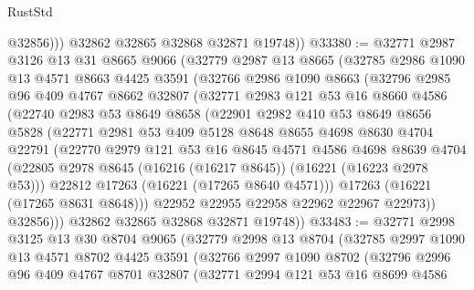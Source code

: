 \begin{lexlean}{RustStd}
\begin{coremodule}
              @32856)))
        @32862
        @32865
        @32868
        @32871
        @19748))
@33380 := @32771
    @2987
    @3126
    @13
    @31
    @8665
    @9066
    (@32779
      @2987
      @13
      @8665
      (@32785
        @2986
        @1090
        @13
        @4571
        @8663
        @4425
        @3591
        (@32766
          @2986
          @1090
          @8663
          (@32796
            @2985
            @96
            @409
            @4767
            @8662
            @32807
            (@32771
              @2983
              @121
              @53
              @16
              @8660
              @4586
              (@22740
                @2983
                @53
                @8649
                @8658
                (@22901
                  @2982
                  @410
                  @53
                  @8649
                  @8656
                  @5828
                  (@22771
                    @2981
                    @53
                    @409
                    @5128
                    @8648
                    @8655
                    @4698
                    @8630
                    @4704
                    @22791
                    (@22770
                      @2979
                      @121
                      @53
                      @16
                      @8645
                      @4571
                      @4586
                      @4698
                      @8639
                      @4704
                      (@22805 @2978 @8645 (@16216 (@16217 @8645)) (@16221 (@16223 @2978 @53)))
                      @22812
                      @17263
                      (@16221 (@17265 @8640 @4571)))
                    @17263
                    (@16221 (@17265 @8631 @8648)))
                  @22952
                  @22955
                  @22958
                  @22962
                  @22967
                  @22973))
              @32856)))
        @32862
        @32865
        @32868
        @32871
        @19748))
@33483 := @32771
    @2998
    @3125
    @13
    @30
    @8704
    @9065
    (@32779
      @2998
      @13
      @8704
      (@32785
        @2997
        @1090
        @13
        @4571
        @8702
        @4425
        @3591
        (@32766
          @2997
          @1090
          @8702
          (@32796
            @2996
            @96
            @409
            @4767
            @8701
            @32807
            (@32771
              @2994
              @121
              @53
              @16
              @8699
              @4586

\end{coremodule}
\end{lexlean}
